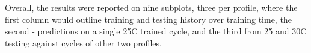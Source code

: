 {Overall, the results were reported on nine subplots, three per profile, where the first column would outline training and testing history over training time, the second - predictions on a single 25\textdegree{}C trained cycle, and the third from 25 and 30\textdegree{}C testing against cycles of other two profiles.
}

